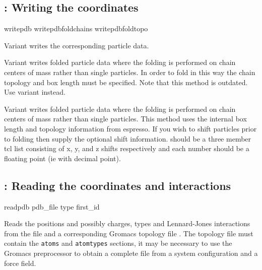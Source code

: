\subsection{: Writing the coordinates}

\begin{essyntax}
   writepdb 
   writepdbfoldchains  
    
   writepdbfoldtopo  
\end{essyntax}

Variant  writes the corresponding particle data. 

Variant  writes folded particle data where the folding is
performed on chain centers of mass rather than single particles. In
order to fold in this way the chain topology and box length must be
specified.  Note that this method is outdated. Use variant 
instead.

Variant  writes folded particle data where the folding is
performed on chain centers of mass rather than single particles. This
method uses the internal box length and topology information from
espresso. If you wish to shift particles prior to folding then supply
the optional shift information.  should be a three member
tcl list consisting of x, y, and z shifts respectively and each number
should be a floating point (ie with decimal point).

\subsection{: Reading the coordinates and interactions}

\begin{essyntax}
  readpdb pdb_file  type  first_id   \\
   
\begin{features}
\end{features}
\end{essyntax}
Reads the positions and possibly charges, types and Lennard-Jones interactions
from the file  and a corresponding Gromacs topology file .
The topology file must contain the \verb|atoms| and \verb|atomtypes| sections,
it may be necessary to use the Gromacs preprocessor to obtain a complete file
from a system configuration and a force field.

